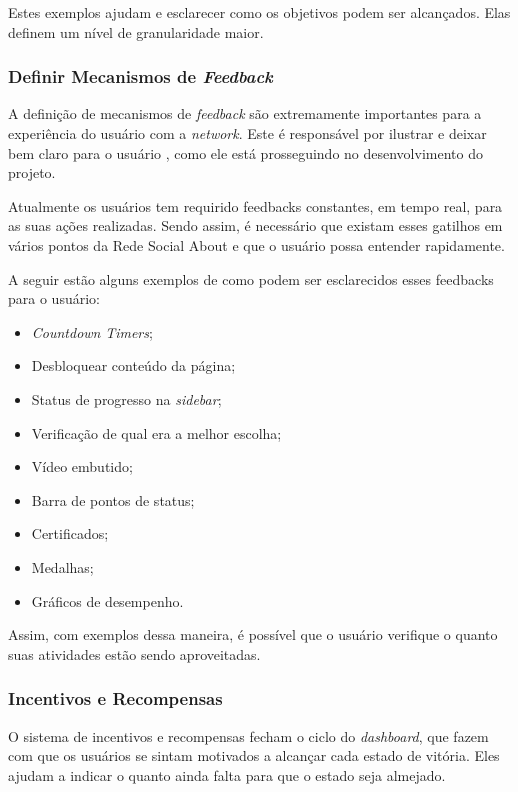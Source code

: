 Estes exemplos ajudam e esclarecer como os objetivos podem ser alcançados. Elas
definem um nível de
granularidade maior.

\subsubsection{Definir Mecanismos de \textit{Feedback}}
\label{sub:define_feedback_mechanics}
A definição de mecanismos de \textit{feedback} são extremamente importantes para a experiência do usuário
com a \textit{network}. Este é responsável por ilustrar e deixar bem claro para o usuário
, como ele está
prosseguindo no desenvolvimento do projeto.

Atualmente os usuários tem requirido feedbacks constantes, em tempo real, para as suas ações
realizadas. Sendo assim, é necessário que existam esses gatilhos em vários pontos da
Rede Social About e que o usuário possa entender rapidamente.

A seguir estão alguns exemplos de como podem ser esclarecidos esses feedbacks para o usuário:

\begin{itemize}
    \item \textit{Countdown} \textit{Timers};
    \item Desbloquear conteúdo da página;
    \item Status de progresso na \textit{sidebar};
    \item Verificação de qual era a melhor escolha;
    \item Vídeo embutido;
    \item Barra de pontos de status;
    \item Certificados;
    \item Medalhas;
    \item Gráficos de desempenho.
\end{itemize}

Assim, com exemplos dessa maneira, é possível que o usuário verifique o quanto suas atividades estão
sendo aproveitadas.

\subsubsection{Incentivos e Recompensas}
\label{sub:incentives_and_rewards}
O sistema de incentivos e recompensas fecham o ciclo do \textit{dashboard}, que fazem com que
os usuários se sintam motivados a alcançar cada estado de vitória. Eles ajudam a
indicar
o quanto ainda falta para que o estado seja almejado.

